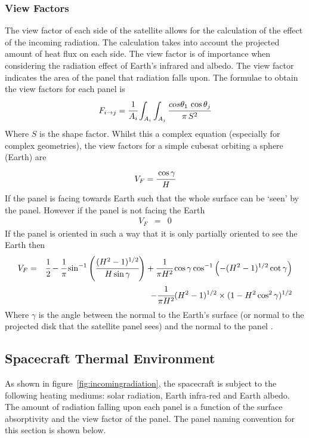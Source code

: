 \subsubsection{View Factors}\label{sec:viewfactors}
The view factor of each side of the satellite allows for the calculation of the effect of the incoming radiation. The calculation takes into account the projected amount of heat flux on each side. The view factor is of importance when considering the radiation effect of Earth's infrared and albedo. The view factor indicates the area of the panel that  radiation falls upon. The formulae to obtain the view factors for each panel is 
\begin{equation}
    F_{i\rightarrow j} = \cfrac{1}{A_i}\int_{A_i} \int_{A_j} \cfrac{cos \theta_1\,\cos\theta_j}{\pi\,S^2} 
\end{equation}
\noindent
Where $S$ is the shape factor. Whilst this a complex equation (especially for complex geometries), the view factors for a simple cubesat orbiting a sphere (Earth) are
\begin{equation}
    V_F = \cfrac{\cos\gamma}{H}
\end{equation}
\noindent 
If the panel is facing towards Earth such that the whole surface can be `seen' by the panel. However if the panel is not facing the Earth
\begin{eqnarray}
    V_F &=& 0 
\end{eqnarray}
\noindent
If the panel is oriented in such a way that it is only partially oriented to see the Earth then
\begin{eqnarray}
    V_F &=& \cfrac{1}{2}-\cfrac{1}{\pi}\sin^{-1}\left(\cfrac{(H^2-1)^{1/2}}{H\sin\gamma}\right) + \cfrac{1}{\pi H^2}\cos\gamma\cos^{-1}\left(-(H^2-1)^{1/2}\cot\gamma\right) \\
    &\,&\qquad -\cfrac{1}{\pi H^2}(H^2-1)^{1/2}\times(1-H^2\cos^2\gamma)^{1/2}
\end{eqnarray}
\noindent
Where $\gamma$ is the angle between the normal to the Earth's surface (or normal to the projected disk that the satellite panel sees) and the normal to the panel \cite{reiss2012new}.

\begin{figure}[H]
\end{figure}



\subsection{Spacecraft Thermal Environment}
As shown in figure~\ref{fig:incomingradiation}, the spacecraft is subject to the following heating mediums: solar radiation, Earth infra-red and Earth albedo. The amount of radiation falling upon each panel is a function of the surface absorptivity and the view factor of the panel. The panel naming convention for this section is shown below.

